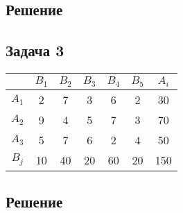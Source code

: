\documentclass[12pt]{article}
\begin{document}
\subsection*{Решение}

\subsection*{Задача 3}

\begin{table}[h!]
\begin{center}
\begin{tabular}{|c|c|c|c|c|c|c|}
\hline
           & $B_1$ & $B_2$ & $B_3$ & $B_4$ & $B_5$ & $A_i$	\\
\hline
 $A_1$ & 2 & 7 & 3 & 6 & 2 & 30	\\
\hline
 $A_2$ & 9 & 4 & 5 & 7 & 3 & 70	\\
\hline
 $A_3$ & 5 & 7 & 6 & 2 & 4 & 50	\\ 
\hline
 $B_j$ & 10 & 40 & 20 & 60 & 20 & 150	\\
\hline
\end{tabular}
\end{center}
\end{table} 
\subsection*{Решение}
\end{document}
